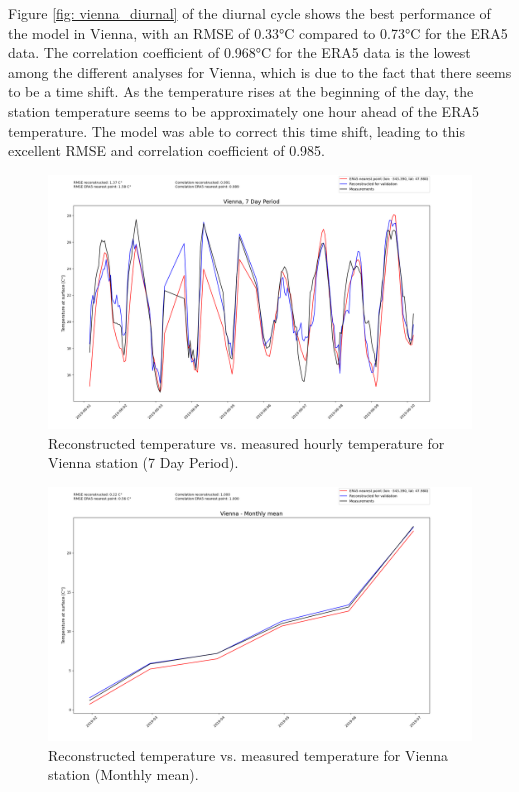 Figure \ref{fig: vienna_diurnal} of the diurnal cycle shows the best performance of the model in Vienna, with an RMSE of 0.33°C compared to 0.73°C for the ERA5 data.
The correlation coefficient of 0.968°C for the ERA5 data is the lowest among the different analyses for Vienna, which is due to the fact that there seems to be a time shift.
As the temperature rises at the beginning of the day, the station temperature seems to be approximately one hour ahead of the ERA5 temperature.
The model was able to correct this time shift, leading to this excellent RMSE and correlation coefficient of 0.985.

\begin{figure}
\centering
\includegraphics[width=1.00\textwidth]{resources/images/charts/vienna_eval_grib_final/Vienna, 7 Day Period_1_2_3.png}
\caption{Reconstructed temperature vs. measured hourly temperature for Vienna station (7 Day Period).}
\label{fig: vienna_7day}
\end{figure}

\begin{figure}
\centering
\includegraphics[width=1.00\textwidth]{resources/images/charts/vienna_eval_grib_final/Vienna - Monthly mean.png}
\caption{Reconstructed temperature vs. measured temperature for Vienna station (Monthly mean).}
\label{fig: vienna_monthly}
\end{figure}

